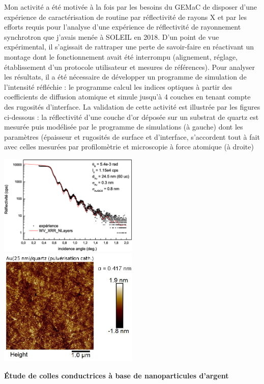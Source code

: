 Mon activité a été motivée à la fois par les besoins du GEMaC de disposer d'une expérience de caractérisation de routine par réflectivité de rayons X et par les efforts requis pour l'analyse d'une expérience de réflectivité de rayonnement synchrotron que j'avais menée à SOLEIL en 2018.
D'un point de vue expérimental, il s'agissait de rattraper une perte de savoir-faire en réactivant un montage dont le fonctionnement avait été interrompu (alignement, réglage, établissement d'un protocole utilisateur et mesures de références).
Pour analyser les résultats, il a été nécessaire de développer un programme de simulation de l'intensité réfléchie : le programme calcul les indices optiques à partir des coefficients de diffusion atomique et simule jusqu'à 4 couches en tenant compte des rugosités d'interface.
La validation de cette activité est illustrée par les figures ci-dessous : la réflectivité d'une couche d'or déposée sur un substrat de quartz est mesurée puis modélisée par le programme de simulations (à gauche) dont les paramètres (épaisseur et rugosités de surface et d'interface, s'accordent tout à fait avec celles mesurées par profilomètrie et microscopie à force atomique (à droite)
\par
\includegraphics[width=0.5\textwidth]{./figures/GValidationAuQuartz.eps}
\includegraphics[width=0.5\textwidth]{./figures/AFM_Au.eps}


\iffalse
	\bigskip
	\textbf{\textsf{\'Etude de colles conductrices à base de nanoparticules d'argent}}


